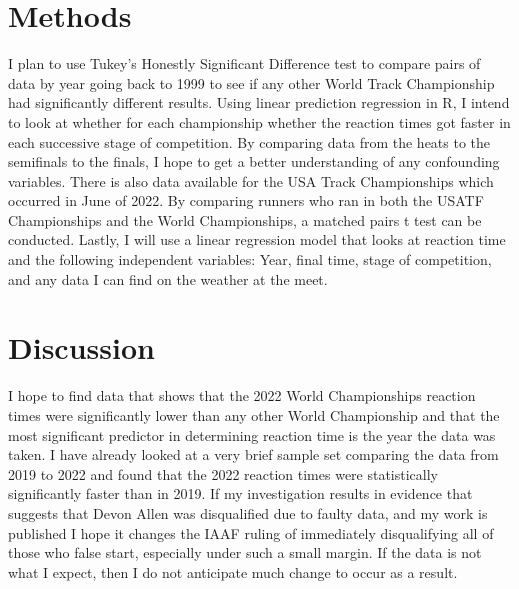 \documentclass[12pt]{article}
\begin{document}
\section{Methods}
I plan to use Tukey’s Honestly Significant Difference test to compare pairs of data by year
going back to 1999 to see if any other World Track Championship had significantly different 
results.  Using linear prediction regression in R, I intend to look at whether for each 
championship whether the reaction times got faster in each successive stage of competition.
By comparing data from the heats to the semifinals to the finals, I hope to get a better 
understanding of any confounding variables.  There is also data available for the USA Track
Championships which occurred in June of 2022.  By comparing runners who ran in both the USATF
Championships and the World Championships, a matched pairs t test can be conducted.  Lastly, I
will use a linear regression model that looks at reaction time and the following independent
variables: Year, final time, stage of competition, and any data I can find on the weather at the
meet.

\section{Discussion}
I hope to find data that shows that the 2022 World Championships reaction times were significantly
lower than any other World Championship and that the most significant predictor in determining
reaction time is the year the data was taken.  I have already looked at a very brief sample set
comparing the data from 2019 to 2022 and found that the 2022 reaction times were statistically
significantly faster than in 2019.  If my investigation results in evidence that suggests that
Devon Allen was disqualified due to faulty data, and my work is published I hope it changes the
IAAF ruling of immediately disqualifying all of those who false start, especially under such a
small margin.  If the data is not what I expect, then I do not anticipate much change to occur as
a result.




\end{document}
